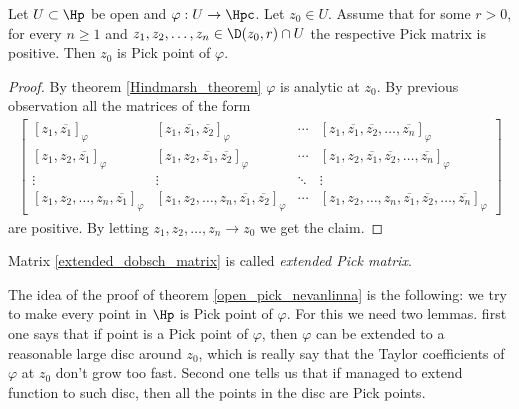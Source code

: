 \begin{lem}
	Let $U \subset \Hp$ be open and $\varphi : U \to \Hpc$. Let $z_{0} \in U$. Assume that for some $r > 0$, for every $n \geq 1$ and $z_{1}, z_{2}, \ldots, z_{n} \in \D(z_{0}, r) \cap U$ the respective Pick matrix is positive. Then $z_{0}$ is Pick point of $\varphi$.
\end{lem}
\begin{proof}
	By theorem \ref{Hindmarsh_theorem} $\varphi$ is analytic at $z_{0}$. By previous observation all the matrices of the form
\begin{align}\label{extended_dobsch_matrix}
\begin{bmatrix}
	[z_{1}, \overline{z_{1}}]_{\varphi} & [z_{1}, \overline{z_{1}}, \overline{z_{2}}]_{\varphi} & \cdots & [z_{1}, \overline{z_{1}}, \overline{z_{2}}, \ldots, \overline{z_{n}}]_{\varphi} \\
	[z_{1}, z_{2}, \overline{z_{1}}]_{\varphi} & [z_{1}, z_{2}, \overline{z_{1}}, \overline{z_{2}}]_{\varphi} & \cdots & [z_{1}, z_{2}, \overline{z_{1}}, \overline{z_{2}}, \ldots, \overline{z_{n}}]_{\varphi} \\
	\vdots & \vdots & \ddots & \vdots \\
	[z_{1}, z_{2}, \ldots, z_{n}, \overline{z_{1}}]_{\varphi} & [z_{1}, z_{2}, \ldots, z_{n}, \overline{z_{1}}, \overline{z_{2}}]_{\varphi} & \cdots &  [z_{1}, z_{2}, \ldots, z_{n}, \overline{z_{1}}, \overline{z_{2}}, \ldots, \overline{z_{n}}]_{\varphi}
\end{bmatrix}
\end{align}
are positive. By letting $z_{1}, z_{2}, \ldots, z_{n} \to z_{0}$ we get the claim.
\end{proof}
Matrix \ref{extended_dobsch_matrix} is called \textit{extended Pick matrix}.

The idea of the proof of theorem \ref{open_pick_nevanlinna} is the following: we try to make every point in $\Hp$ is Pick point of $\varphi$. For this we need two lemmas. first one says that if point is a Pick point of $\varphi$, then $\varphi$ can be extended to a reasonable large disc around $z_{0}$, which is really say that the Taylor coefficients of $\varphi$ at $z_{0}$ don't grow too fast. Second one tells us that if managed to extend function to such disc, then all the points in the disc are Pick points.

